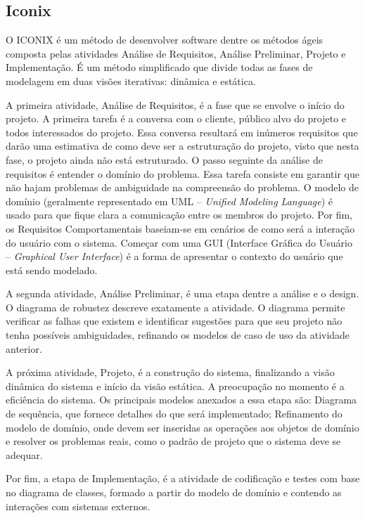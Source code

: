 \subsection{Iconix}
O ICONIX é um método de desenvolver software dentre os métodos ágeis composta pelas atividades Análise de Requisitos, Análise Preliminar, Projeto e Implementação. É um método simplificado que divide todas as fases de modelagem em duas visões iterativas: dinâmica e estática. 

A primeira atividade, Análise de Requisitos, é a fase que se envolve o início do projeto. A primeira tarefa é a conversa com o cliente, público alvo do projeto e todos interessados do projeto. Essa conversa resultará em inúmeros requisitos que darão uma estimativa de como deve ser a estruturação do projeto, visto que nesta fase, o projeto ainda não está estruturado.
O passo seguinte da análise de requisitos é entender o domínio do problema. Essa tarefa consiste em garantir que não hajam problemas de ambiguidade na compreensão do problema. O modelo de domínio (geralmente representado em UML -- \emph{Unified Modeling Language}) é usado para que fique clara a comunicação entre os membros do projeto.
Por fim, os Requisitos Comportamentais baseiam-se em cenários de como será a interação do usuário com o sistema. Começar com uma GUI (Interface Gráfica do Usuário -- \emph{Graphical User Interface}) é a forma de apresentar o contexto do usuário que está sendo modelado.

A segunda atividade, Análise Preliminar, é uma etapa dentre a análise e o design. O diagrama de robustez descreve exatamente a atividade. O diagrama permite verificar as falhas que existem e identificar sugestões para que seu projeto não tenha possíveis ambiguidades, refinando os modelos de caso de uso da atividade anterior.

A próxima atividade, Projeto, é a construção do sistema, finalizando a visão dinâmica do sistema e início da visão estática. A preocupação no momento é a eficiência do sistema. Os principais modelos anexados a essa etapa são: Diagrama de sequência, que fornece detalhes do que será implementado; Refinamento do modelo de domínio, onde devem ser inseridas as operações aos objetos de domínio e resolver os problemas reais, como o padrão de projeto que o sistema deve se adequar.

Por fim, a etapa de Implementação, é a atividade de codificação e testes com base no diagrama de classes, formado a partir do modelo de domínio e contendo as interações com sistemas externos.

